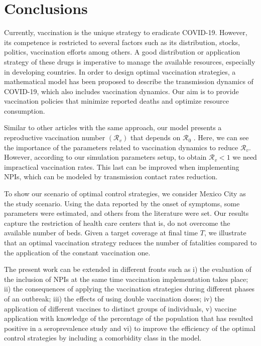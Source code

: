 \documentclass[preprint, sort&compress]{elsarticle}
\begin{document}
 	\section{Conclusions}
		\noindent Currently, vaccination is the unique strategy to eradicate COVID-19. However, its competence is restricted to several factors such as its distribution, stocks, politics, vaccination efforts among others.
 A good distribution or application strategy of these drugs is imperative to manage the available resources, especially in developing countries. In order to design optimal vaccination strategies, a mathematical model has been proposed to describe the transmission dynamics of COVID-19, which also includes vaccination dynamics. Our aim is to provide vaccination policies that minimize reported deaths and optimize resource consumption.
 
Similar to other articles with the same approach, our model presents a reproductive vaccination number $(\mathcal{R}_{v})$ that depends on $\mathcal{R}_{0}$ \cite{Alexander2004}. Here, we can see the importance of the parameters related to vaccination dynamics to reduce $\mathcal{R}_{v}$. However, according to our simulation parameters setup, to obtain $\mathcal{R}_{v} < 1$ we need impractical vaccination rates. This last can be improved when implementing NPIs, which can be modeled by transmission contact rates reduction.

To show our scenario of optimal control strategies, we consider Mexico City as the study scenario. Using the data reported by the onset of symptoms, some parameters were estimated, and others from the literature were set. Our results capture the restriction of health care centers that is, do not overcome the available number of beds. Given a target coverage at final time $T$, we illustrate that an optimal vaccination strategy reduces the number of fatalities compared to the application of the constant vaccination one. 

The present work can be extended in different fronts such as i) the evaluation of the inclusion of NPIs at the same time vaccination implementation takes place; ii) the consequences of applying the vaccination strategies during different phases of an outbreak; iii) the effects of using double vaccination doses; iv) the application of different vaccines to distinct groups of individuals, v) vaccine application with knowledge of the percentage of the population that has resulted positive in a seroprevalence study and vi) to improve the efficiency of the optimal control strategies by including a comorbidity class in the model. 	
\end{document}
